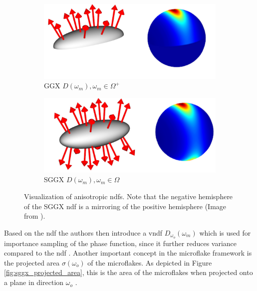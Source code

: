 \begin{figure}[ht]
    \centering
    \begin{subfigure}[b]{0.45\linewidth}
        \centering
        \includegraphics[width=\linewidth]{img/sggx_ndf_a.jpg}
        \caption{GGX $D(\omega_m), \omega_m \in \Omega^+$}
        \label{fig:sggx_ndf_a}
    \end{subfigure}
    \begin{subfigure}[b]{0.45\linewidth}
        \centering
        \includegraphics[width=1\linewidth]{img/sggx_ndf_b.jpg}
        \caption{SGGX $D(\omega_m), \omega_m \in \Omega$}
        \label{fig:sggx_ndf_b}
    \end{subfigure}
	\caption[Visualization of anisotropic \acsp{ndf}]{Visualization of anisotropic \acsp{ndf}. Note that the negative hemisphere of the SGGX \acs{ndf} is a mirroring of the positive hemisphere (Image from \cite{sggx}).}
	\label{fig:sggx_ndf}
\end{figure}
Based on the \acs{ndf} the authors then introduce a \ac{vndf} $D_{\omega_o}(\omega_m)$ which is used for importance sampling of the phase function, since it further reduces variance compared to the \acs{ndf} \cite{vndf_importance_sampling}.
Another important concept in the microflake framework is the projected area $\sigma(\omega_o)$ of the microflakes.
As depicted in Figure \ref{fig:sggx_projected_area}, this is the area of the microflakes when projected onto a plane in direction $\omega_o$ \cite{sggx}.
